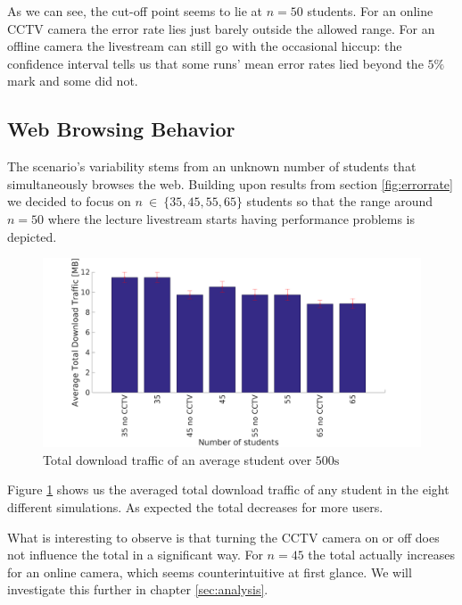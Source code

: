 \documentclass[a4paper]{scrreprt}
\begin{document}
			As we can see, the cut-off point seems to lie at $n=50$ students. For an online CCTV camera the error rate lies just barely outside the allowed range. For an offline camera the livestream can still go with the occasional hiccup: the confidence interval tells us that some runs' mean error rates lied beyond the $5\%$ mark and some did not.							
		
		\subsection{Web Browsing Behavior}\label{sec:http}
			The scenario's variability stems from an unknown number of students that simultaneously browses the web. Building upon results from section \ref{fig:errorrate} we decided to focus on $n~\in~\{35, 45, 55, 65\}$ students so that the range around $n=50$ where the lecture livestream starts having performance problems is depicted.
			
			\begin{figure}[H]
				\center\includegraphics[width=\textwidth]{../Results_Analysis/HTTP/http.png}
				\caption{Total download traffic of an average student over $500\text{s}$}
				\label{fig:http}
			\end{figure}
			
			Figure \ref{fig:http} shows us the averaged total download traffic of any student in the eight different simulations. As expected the total decreases for more users.
			
			What is interesting to observe is that turning the CCTV camera on or off does not influence the total in a significant way. For $n=45$ the total actually increases for an online camera, which seems counterintuitive at first glance. We will investigate this further in chapter \ref{sec:analysis}.		
			
\end{document}
